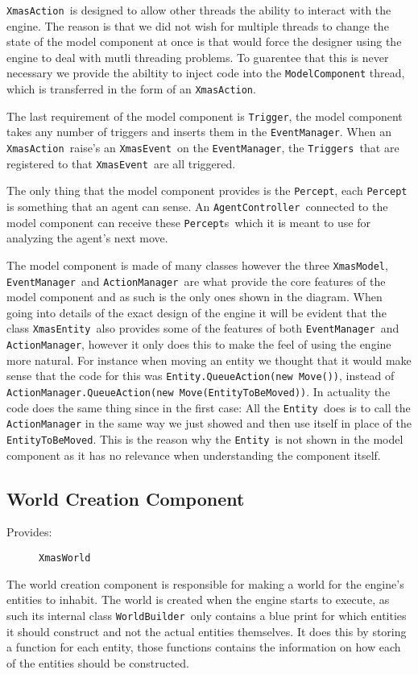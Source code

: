 \texttt{XmasAction }is designed to allow other threads the ability
to interact with the engine. The reason is that we did not wish for
multiple threads to change the state of the model component at once
is that would force the designer using the engine to deal with mutli
threading problems. To guarentee that this is never necessary we provide
the abiltity to inject code into the \texttt{ModelComponent} thread,
which is transferred in the form of an \texttt{XmasAction}.

The last requirement of the model component is \texttt{Trigger}, the
model component takes any number of triggers and inserts them in the
\texttt{EventManager}. When an \texttt{XmasAction }raise\textquoteright{}s
an \texttt{XmasEvent }on the \texttt{EventManager}, the \texttt{Triggers
}that are registered to that \texttt{XmasEvent }are all triggered. 

The only thing that the model component provides is the \texttt{Percept},
each \texttt{Percept }is something that an agent can sense. An \texttt{AgentController
}connected to the model component can receive these \texttt{Percept}s\texttt{
}which it is meant to use for analyzing the agent\textquoteright{}s
next move.

The model component is made of many classes however the three \texttt{XmasModel},
\texttt{EventManager }and \texttt{ActionManager }are what provide
the core features of the model component and as such is the only ones
shown in the diagram. When going into details of the exact design
of the engine it will be evident that the class \texttt{XmasEntity
}also provides some of the features of both \texttt{EventManager }and
\texttt{ActionManager}, however it only does this to make the feel
of using the engine more natural. For instance when moving an entity
we thought that it would make sense that the code for this was \texttt{Entity.QueueAction(new
Move())}, instead of \texttt{ActionManager.QueueAction(new Move(EntityToBeMoved))}.
In actuality the code does the same thing since in the first case:
All the \texttt{Entity }does is to call the \texttt{ActionManager}
in the same way we just showed and then use itself in place of the
\texttt{EntityToBeMoved}. This is the reason why the \texttt{Entity
}is not shown in the model component as it has no relevance when understanding
the component itself.


\subsection{World Creation Component}
\begin{description}
\item [{Provides:}] \texttt{XmasWorld}
\end{description}
The world creation component is responsible for making a world for
the engine\textquoteright{}s entities to inhabit. The world is created
when the engine starts to execute, as such its internal class \texttt{WorldBuilder
}only contains a blue print for which entities it should construct
and not the actual entities themselves. It does this by storing a
function for each entity, those functions contains the information
on how each of the entities should be constructed.

